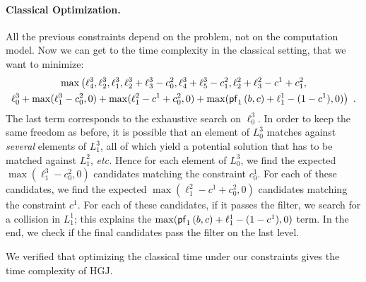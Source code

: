\paragraph{Classical Optimization.}
All the previous constraints depend on the problem, not on the computation model. Now we can get to the time complexity in the classical setting, that we want to minimize:
\begin{multline*}
\max \big( \ell_4^3, \ell_2^3, \ell_1^3, \ell_2^3 + \ell_3^3 - c_0^2, \ell_4^3 + \ell_5^3 - c_1^2, \ell_2^2 + \ell_3^2 - c^1 + c_1^2, \\
\ell_0^3 + \max( \ell_1^3 - c_0^2, 0 ) + \max( \ell_1^2 - c^1 + c_0^2 ,0 )+\max( \mathsf{pf}_1 \left(b, c \right)+\ell^1_1-(1-c^1), 0 ) \big) \enspace.
\end{multline*}
The last term corresponds to the exhaustive search on $\ell_0^3$. In order to keep the same freedom as before, it is possible that an element of $L_0^3$ matches against \emph{several} elements of $L_1^3$, all of which yield a potential solution that has to be matched against $L_1^2$, \emph{etc.} Hence for each element of $L_0^3$, we find the expected $\max( \ell_1^3 - c_0^2, 0 )$ candidates matching the constraint $c_0^1$. For each of these candidates, we find the expected $\max( \ell_1^2 - c^1 + c_0^2 ,0 )$ candidates matching the constraint $c^1$. For each of these candidates, if it passes the filter, we search for a collision in $L_1^1$; this explains the $\max( \mathsf{pf}_1 \left(b, c \right)+\ell^1_1-(1-c^1), 0 ) $ term. In the end, we check if the final candidates pass the filter on the last level. 

We verified that optimizing the classical time under our constraints gives the time complexity of HGJ.


